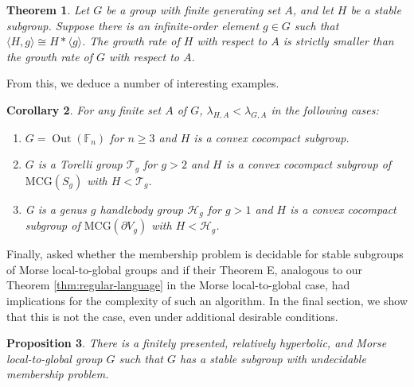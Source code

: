 \documentclass[11pt,letterpaper]{amsart}
\newtheorem{thmx}{Theorem}
\newtheorem{corx}[thmx]{Corollary}
\newtheorem{propx}[thmx]{Proposition}
\theoremstyle{definition}
\theoremstyle{plain}
\theoremstyle{TheoremNum}
\DeclareMathOperator{\Out}{\mathrm{Out}}
\begin{document}
\begin{thmx}\label{thmx:growth-rate-gap}
    Let $G$ be a group with finite generating set $A$, and let $H$ be a stable subgroup. Suppose there is an infinite-order element $g \in G$ such that $\langle H , g \rangle \cong H * \langle g \rangle$. The growth rate of $H$ with respect to $A$ is strictly smaller than the growth rate of $G$ with respect to $A$.
\end{thmx}

From this, we deduce a number of interesting examples.
\begin{corx}\label{corx:transverse-examples}
    For any finite set $A$ of $G$, $\lambda_{H,A} < \lambda_{G, A}$ in the following cases:
    \begin{enumerate}
        \item $G = \Out(\mathbb{F}_n)$ for $n \geq 3$ and $H$ is a convex cocompact subgroup.
        \item $G$ is a Torelli group $\mathcal{T}_g$ for $g > 2$ and $H$ is a convex cocompact subgroup of $\mathrm{MCG}(S_g)$ with $H < \mathcal{T}_g$.
        \item G is a genus $g$ handlebody group $\mathcal{H}_g$ for $g > 1$ and $H$ is a convex cocompact subgroup of $\mathrm{MCG}(\partial V_g)$ with $H < \mathcal{H}_g$.
    \end{enumerate}
\end{corx}

Finally, \cite[Question~3]{CRSZ} asked whether the membership problem is decidable for stable subgroups of Morse local-to-global groups and if their Theorem E, analogous to our Theorem \ref{thm:regular-language} in the Morse local-to-global case, had implications for the complexity of such an algorithm. In the final section, we show that this is not the case, even under additional desirable conditions.

\begin{propx}\label{propx:counterexample}
    There is a finitely presented, relatively hyperbolic, and Morse local-to-global group $G$ such that $G$ has a stable subgroup with undecidable membership problem. 
\end{propx}
\end{document}
